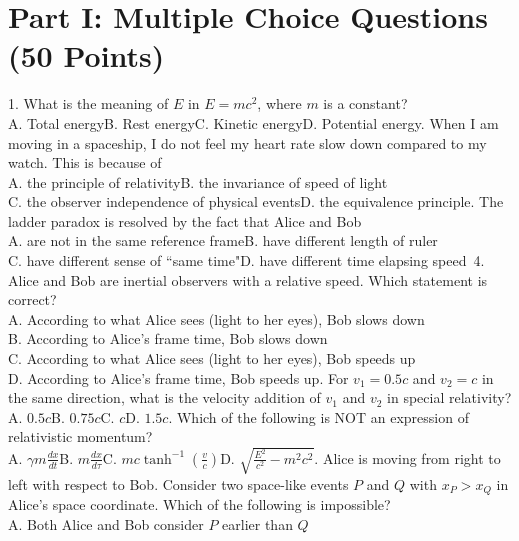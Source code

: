 \documentclass[12pt]{book} %
\numberwithin{equation}{chapter}
\def\c{\gamma}
\def\t{\tau}
\def\mc{\hspace{0.5cm}}
\begin{document}
\section*{Part I: Multiple Choice Questions (50 Points)}
1. What is the meaning of $E$ in $E=mc^{2}$, where $m$ is a constant?\\
A. Total energy\mc B. Rest energy\mc C. Kinetic energy\mc D. Potential energy\bigskip{}. When I am moving in a spaceship, I do not feel my heart rate slow down compared to my watch. This is because of\\
A. the principle of relativity\mc B. the invariance of speed of light\\
C. the observer independence of physical events\mc D. the equivalence principle\bigskip{}. The ladder paradox is resolved by the fact that Alice and Bob\\
A. are not in the same reference frame\mc B. have different length of ruler\\
C. have different sense of ``same time"\mc D. have different time elapsing speed\bigskip\newline\
4. Alice and Bob are inertial observers with a relative speed. Which statement is correct?\\
A. According to what Alice sees (light to her eyes), Bob slows down\\
B. According to Alice's frame time, Bob slows down\\
C. According to what Alice sees (light to her eyes), Bob speeds up\\
D. According to Alice's frame time, Bob speeds up\bigskip\newline
5. For $v_{1}=0.5c$ and $v_{2}=c$ in the same direction, what is the velocity addition of $v_{1}$ and $v_{2}$ in special relativity?\\
A. $0.5c$\mc B. $0.75c$\mc C. $c$\mc D. $1.5c$\bigskip{}. Which of the following is NOT an expression of relativistic momentum?\\
A. $\c m\frac{dx}{dt}$\mc B. $m\frac{dx}{d\t}$\mc C. $mc\tanh^{-1}\left(\frac{v}{c}\right)$\mc D. $\sqrt{\frac{E^{2}}{c^{2}}-m^{2}c^{2}}$\bigskip\newline
7. Alice is moving from right to left with respect to Bob. Consider two space-like events $P$ and $Q$ with $x_{P}>x_{Q}$ in Alice's space coordinate. Which of the following is impossible?\\
A. Both Alice and Bob consider $P$ earlier than $Q$\\
\end{document}
